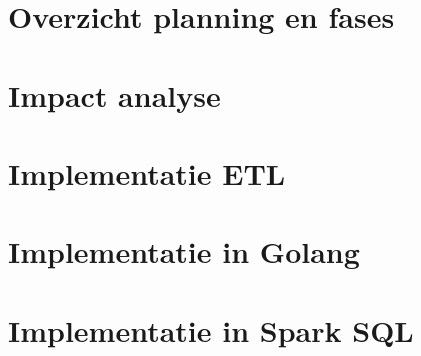\documentclass[whitelogo]{tudelft-report}
\begin{document}




\appendix

\chapter{Overzicht planning en fases}
\label{app:planning}


\chapter{Impact analyse}
\label{app:impact_analyse}


\chapter{Implementatie ETL}
\label{app:json_format}


\chapter{Implementatie in Golang}
\label{app:golang_code}


\chapter{Implementatie in Spark SQL}
\label{app:spark_code}


\printbibliography
\end{document}
